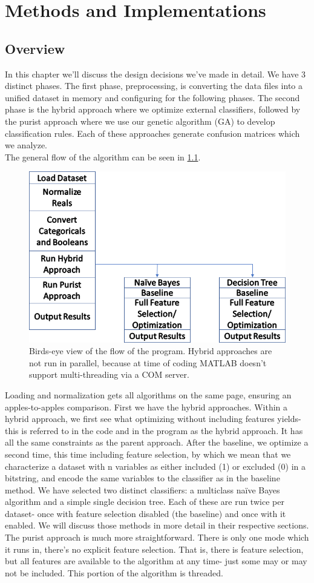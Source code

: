 \chapter{Methods and Implementations} \label{ch:Methods}
\section{Overview}
In this chapter we'll discuss the design decisions we've made in detail.  We
have 3 distinct phases.  The first phase, preprocessing, is converting the data
files into a unified dataset in memory and configuring for the following phases.
The second phase is the hybrid approach where we optimize external classifiers,
followed by the purist approach where we use our genetic algorithm (GA) to
develop classification rules.  Each of these approaches generate confusion
matrices which we analyze.\\
The general flow of the algorithm can be seen in \ref{fig:ProgramFlow}. 
\begin{figure}
	\centering
	\includegraphics[width=0.7\linewidth]{figures/png/ProgramFlow}
	\caption[Overall Program Flow]{Birds-eye view of the flow of the program.
		Hybrid approaches are not run in parallel, because at time of coding MATLAB
		doesn't support multi-threading via a COM server.}
	\label{fig:ProgramFlow}
\end{figure}
Loading and normalization gets all algorithms on the same page, ensuring an
apples-to-apples comparison.  First we have the hybrid approaches.  Within a
hybrid approach, we first see what optimizing without including features yields-
this is referred to in the code and in the program as the hybrid approach.  It
has all the same constraints as the parent approach.  After the baseline, we
optimize a second time, this time including feature selection, by which we mean
that we characterize a dataset with n variables as either included (1) or
excluded (0) in a bitstring, and encode the same variables to the classifier as
in the baseline method.  We have selected two distinct classifiers: a multiclass
na\"ive Bayes algorithm and a simple single decision tree.  Each of these are
run twice per dataset- once with feature selection disabled (the baseline) and
once with it enabled.  We will discuss those methods in more detail in their
respective sections.\\The purist approach is much more straightforward.  There
is only one mode which it runs in, there's no explicit feature selection.  That
is, there is feature selection, but all features are available to the algorithm
at any time- just some may or may not be included. This portion of the algorithm
is threaded.  
